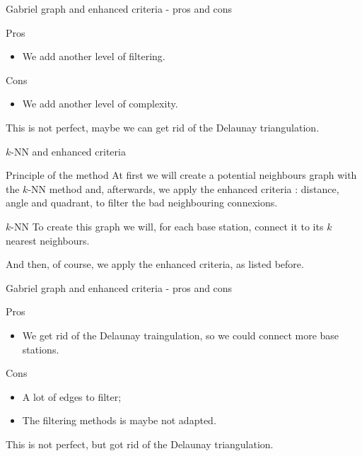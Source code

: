 \begin{frame}{Gabriel graph and enhanced criteria - pros and cons}
    \begin{block}{Pros}
        \begin{itemize}
            \item We add another level of filtering.
        \end{itemize}
    \end{block}

    \begin{block}{Cons}
        \begin{itemize}
            \item We add another level of complexity.
        \end{itemize}
    \end{block}

    This is not perfect, maybe we can get rid of the Delaunay triangulation.
\end{frame}

\begin{frame}{$k$-NN and enhanced criteria}
    \begin{block}{Principle of the method}
        At first we will create a potential neighbours graph with the $k$-NN method and, afterwards, we apply the enhanced criteria : distance, angle and quadrant,
        to filter the bad neighbouring connexions.
    \end{block}

    \begin{block}{$k$-NN\footnotemark}
        To create this graph we will, for each base station, connect it to its $k$ nearest neighbours.
    \end{block}

    And then, of course, we apply the enhanced criteria, as listed before.

\end{frame}

\begin{frame}{Gabriel graph and enhanced criteria - pros and cons}
    \begin{block}{Pros}
        \begin{itemize}
            \item We get rid of the Delaunay traingulation, so we could connect more base stations.
        \end{itemize}
    \end{block}

    \begin{block}{Cons}
        \begin{itemize}
            \item A lot of edges to filter;
            \item The filtering methods is maybe not adapted.
        \end{itemize}
    \end{block}

    This is not perfect, but got rid of the Delaunay triangulation.
\end{frame}